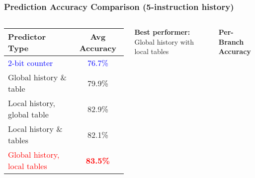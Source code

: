 \documentclass[aspectratio=169,12pt]{beamer}
\begin{document}
\begin{frame}
  \frametitle{Prediction Accuracy Comparison (5-instruction history)}
  
  \begin{columns}[T]
    \footnotesize
    \begin{tabular}{|l|c|}
      \hline
      \textbf{Predictor Type} & \textbf{Avg Accuracy} \\
      \hline
      \textcolor{blue}{2-bit counter} & \textcolor{blue}{76.7\%} \\
      Global history \& table & 79.9\% \\
      Local history, global table & 82.9\% \\
      Local history \& tables & 82.1\% \\
      \textcolor{red}{Global history, local tables} & \textcolor{red}{\textbf{83.5\%}} \\
      \hline
    \end{tabular}
    
    \vspace{0.5em}
    \footnotesize
    \textbf{Best performer:} Global history with local tables
    
    \begin{center}
      \textbf{Per-Branch Accuracy}\\[0.5em]
    \end{center}
  \end{columns}
\end{frame}
\end{document}

